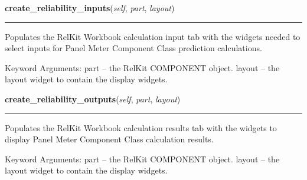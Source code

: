     \label{reliafree:meters:meter:Panel:create_reliability_inputs}

    \vspace{0.5ex}

\hspace{.8\funcindent}\begin{boxedminipage}{\funcwidth}

    \raggedright \textbf{create\_reliability\_inputs}(\textit{self}, \textit{part}, \textit{layout})

    \vspace{-1.5ex}

    \rule{\textwidth}{0.5\fboxrule}
\setlength{\parskip}{2ex}
    Populates the RelKit Workbook calculation input tab with the widgets
    needed to select inputs for Panel Meter Component Class prediction 
    calculations.

    Keyword Arguments: part   -- the RelKit COMPONENT object. layout -- 
    the layout widget to contain the display widgets.

\setlength{\parskip}{1ex}
    \end{boxedminipage}

    \label{reliafree:meters:meter:Panel:create_reliability_outputs}

    \vspace{0.5ex}

\hspace{.8\funcindent}\begin{boxedminipage}{\funcwidth}

    \raggedright \textbf{create\_reliability\_outputs}(\textit{self}, \textit{part}, \textit{layout})

    \vspace{-1.5ex}

    \rule{\textwidth}{0.5\fboxrule}
\setlength{\parskip}{2ex}
    Populates the RelKit Workbook calculation results tab with the 
    widgets to display Panel Meter Component Class calculation results.

    Keyword Arguments: part   -- the RelKit COMPONENT object. layout -- 
    the layout widget to contain the display widgets.

\setlength{\parskip}{1ex}
    \end{boxedminipage}

